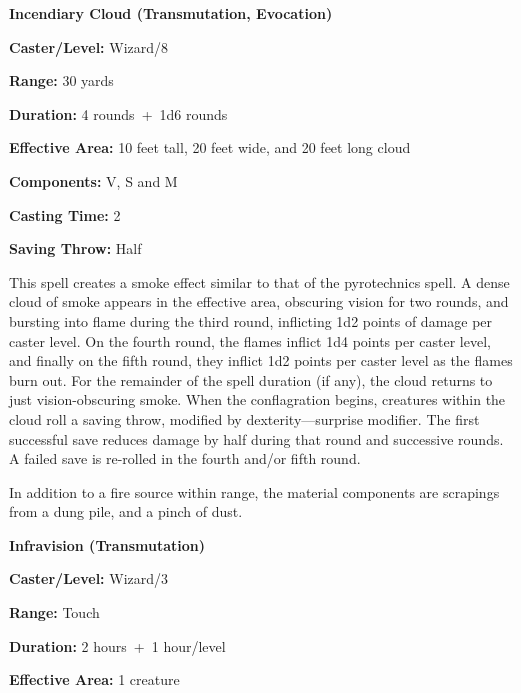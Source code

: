 \begin{multicols}{2}
\vspace{1em}

\noindent
\begin{minipage}{\columnwidth}

\noindent \textbf{Incendiary Cloud (Transmutation, Evocation)}

\noindent \textbf{Caster/Level:} Wizard/8

\noindent \textbf{Range:} 30 yards

\noindent \textbf{Duration:} 4 rounds~+~1d6 rounds

\noindent \textbf{Effective Area:} 10 feet tall, 20 feet wide, and 20 feet long cloud

\noindent \textbf{Components:} V, S and M

\noindent \textbf{Casting Time:} 2

\noindent \textbf{Saving Throw:} Half 

\end{minipage}

This spell creates a smoke effect similar to that of the pyrotechnics spell.  A dense cloud of smoke appears in the effective area, obscuring vision for two rounds, and bursting into flame during the third round, inflicting 1d2 points of damage per caster level.  On the fourth round, the flames inflict 1d4 points per caster level, and finally on the fifth round, they inflict 1d2 points per caster level as the flames burn out.  For the remainder of the spell duration (if any), the cloud returns to just vision-obscuring smoke.  When the conflagration begins, creatures within the cloud roll a saving throw, modified by dexterity---surprise modifier.  The first successful save reduces damage by half during that round and successive rounds.  A failed save is re-rolled in the fourth and/or fifth round.

In addition to a fire source within range, the material components are scrapings from a dung pile, and a pinch of dust.

\vspace{1em}

\noindent
\begin{minipage}{\columnwidth}

\noindent \textbf{Infravision (Transmutation)}

\noindent \textbf{Caster/Level:} Wizard/3

\noindent \textbf{Range:} Touch

\noindent \textbf{Duration:} 2 hours~+~1 hour/level

\noindent \textbf{Effective Area:} 1 creature


\end{minipage}
\end{multicols}
